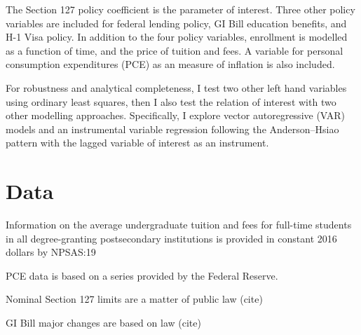 \documentclass[review]{elsarticle}
\begin{document}
    The Section 127 policy coefficient is the parameter of interest.
    Three other policy variables are included for federal lending policy, GI Bill education benefits, and H-1 Visa policy.
    In addition to the four policy variables, 
    enrollment is modelled as a function of time,
    and the price of tuition and fees.
    A variable for personal consumption expenditures (PCE) as an measure of inflation is also included.

    For robustness and analytical completeness, I test two other left hand variables using ordinary least squares,
    then I also test the relation of interest with two other modelling approaches.
    Specifically, I explore vector autoregressive (VAR) models
    and an instrumental variable regression following the Anderson–Hsiao pattern\cite{anderson1981estimation} with the lagged variable of interest as an instrument.

    \section{Data}

    Information on the average undergraduate tuition and fees for full-time students in all degree-granting postsecondary institutions
    is provided in constant 2016 dollars by NPSAS:19


    PCE data is based on a series provided by the Federal Reserve.


    Nominal Section 127 limits are a matter of public law (cite)

    GI Bill major changes are based on law (cite)

\end{document}
